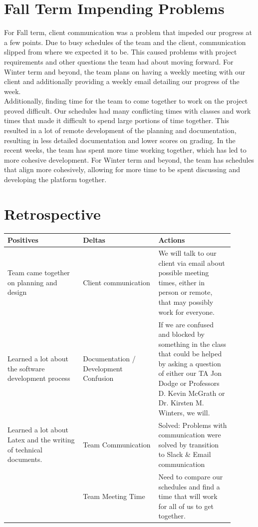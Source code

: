\documentclass[onecolumn, draftclsnofoot,10pt, compsoc]{IEEEtran}
\begin{document}
\section{Fall Term Impending Problems}

For Fall term, client communication was a problem that impeded our progress
at a few points. Due to busy schedules of the team and the client, communication
slipped from where we expected it to be.
This caused problems with project requirements and other questions the team
had about moving forward. For Winter term and beyond, the team plans on having
a weekly meeting with our client and additionally providing a weekly email
detailing our progress of the week. \\

\noindent Additionally, finding time for the team to come together to work
on the project proved difficult.
Our schedules had many conflicting times with classes and work times that
made it difficult to spend large portions of time together.
This resulted in a lot of remote development of the planning and documentation,
resulting in less detailed documentation and lower scores on grading.
In the recent weeks, the team has spent more time working together, which has
led to more cohesive development. For Winter term and beyond, the team has
schedules that align more cohesively, allowing for more time to be spent
discussing and developing the platform together.

\section{Retrospective}

\begin{tabular}{|p{0.3\linewidth}|p{0.3\linewidth}|p{0.3\linewidth}|}
\hline

	Positives
	& Deltas
	& Actions \\ \hline

	Team came together on planning and design
	& Client communication
	& We will talk to our client via email about possible meeting times,
		either in person or remote, that may possibly work for everyone. \\ \hline

	Learned a lot about the software development process
	& Documentation / Development Confusion
	& If we are confused and blocked by something in the class that could
		be helped by asking a question of either our TA Jon Dodge or Professors
		D. Kevin McGrath or Dr. Kirsten M. Winters, we will. \\ \hline

	Learned a lot about Latex and the writing of technical documents.
	& Team Communication
	& Solved: Problems with communication were solved by
		transition to Slack \& Email communication \\  \hline

	& Team Meeting Time
	& Need to compare our schedules and find a time that will work
		for all of us to get together. \\ \hline

\end{tabular}
\end{document}
